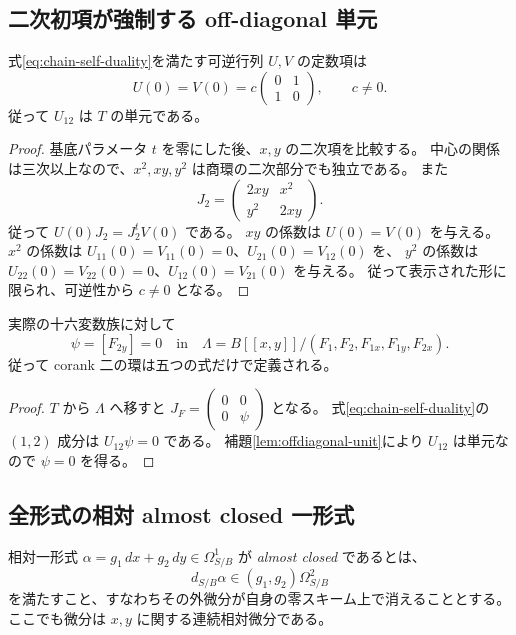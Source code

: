 \subsection{二次初項が強制する off-diagonal 単元}

\begin{lemma}\label{lem:offdiagonal-unit}
式\eqref{eq:chain-self-duality}を満たす可逆行列 $U,V$ の定数項は
\[
 U(0)=V(0)=c\begin{pmatrix}0&1\\1&0\end{pmatrix},\qquad c\ne0.
\]
従って $U_{12}$ は $T$ の単元である。
\end{lemma}

\begin{proof}
基底パラメータ $t$ を零にした後、$x,y$ の二次項を比較する。
中心の関係は三次以上なので、$x^2,xy,y^2$ は商環の二次部分でも独立である。
また
\[
 J_2=\begin{pmatrix}2xy&x^2\\y^2&2xy\end{pmatrix}.
\]
従って $U(0)J_2=J_2^tV(0)$ である。
$xy$ の係数は $U(0)=V(0)$ を与える。
$x^2$ の係数は $U_{11}(0)=V_{11}(0)=0$、$U_{21}(0)=V_{12}(0)$ を、
$y^2$ の係数は $U_{22}(0)=V_{22}(0)=0$、$U_{12}(0)=V_{21}(0)$ を与える。
従って表示された形に限られ、可逆性から $c\ne0$ となる。
\end{proof}

\begin{theorem}\label{thm:psi-vanishing}
実際の十六変数族に対して
\[
 \psi=[F_{2y}]=0\quad\text{in}\quad
 \Lambda=B[[x,y]]/(F_1,F_2,F_{1x},F_{1y},F_{2x}).
\]
従って corank 二の環は五つの式だけで定義される。
\end{theorem}

\begin{proof}
$T$ から $\Lambda$ へ移すと
$J_F=\left(\begin{smallmatrix}0&0\\0&\psi\end{smallmatrix}\right)$ となる。
式\eqref{eq:chain-self-duality}の $(1,2)$ 成分は $U_{12}\psi=0$ である。
補題\ref{lem:offdiagonal-unit}により $U_{12}$ は単元なので $\psi=0$ を得る。
\end{proof}

\subsection{全形式の相対 almost closed 一形式}

相対一形式 $\alpha=g_1\,dx+g_2\,dy\in\Omega^1_{S/B}$ が
\emph{almost closed} であるとは、
\[
 d_{S/B}\alpha\in(g_1,g_2)\Omega^2_{S/B}
\]
を満たすこと、すなわちその外微分が自身の零スキーム上で消えることとする。
ここでも微分は $x,y$ に関する連続相対微分である。

